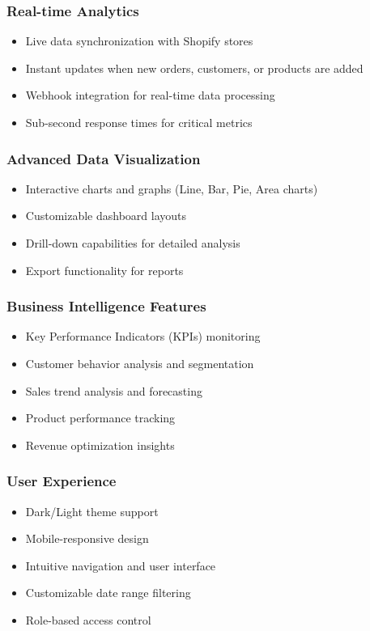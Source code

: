 \documentclass[12pt]{article}
\begin{document}
\subsubsection{Real-time Analytics}
\begin{itemize}
    \item Live data synchronization with Shopify stores
    \item Instant updates when new orders, customers, or products are added
    \item Webhook integration for real-time data processing
    \item Sub-second response times for critical metrics
\end{itemize}

\subsubsection{Advanced Data Visualization}
\begin{itemize}
    \item Interactive charts and graphs (Line, Bar, Pie, Area charts)
    \item Customizable dashboard layouts
    \item Drill-down capabilities for detailed analysis
    \item Export functionality for reports
\end{itemize}

\subsubsection{Business Intelligence Features}
\begin{itemize}
    \item Key Performance Indicators (KPIs) monitoring
    \item Customer behavior analysis and segmentation
    \item Sales trend analysis and forecasting
    \item Product performance tracking
    \item Revenue optimization insights
\end{itemize}

\subsubsection{User Experience}
\begin{itemize}
    \item Dark/Light theme support
    \item Mobile-responsive design
    \item Intuitive navigation and user interface
    \item Customizable date range filtering
    \item Role-based access control
\end{itemize}
\end{document}
